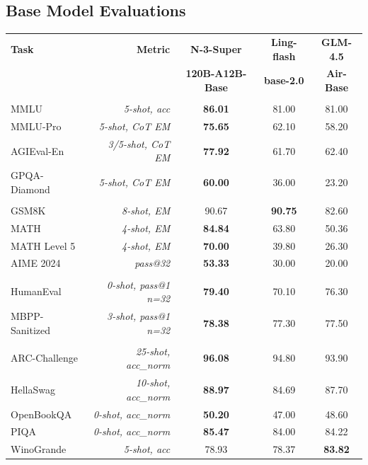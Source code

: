 \subsection{Base Model Evaluations}
\label{subsec:base_model_evals}

\begin{table}[h!]
\centering
\small
\setlength{\tabcolsep}{7pt}
\renewcommand{\arraystretch}{1.3}

\begin{tabular}{lr|ccc}
\toprule
\textbf{Task} & \textbf{Metric} &
\multicolumn{1}{c}{\textbf{N-3-Super}} &
\multicolumn{1}{c}{\textbf{Ling-flash}} &
\multicolumn{1}{c}{\textbf{GLM-4.5}} \\
& &
\multicolumn{1}{c}{\textbf{120B-A12B-Base}} &
\multicolumn{1}{c}{\textbf{base-2.0}} &
\multicolumn{1}{c}{\textbf{Air-Base}} \\
\midrule

\rowcolor{black!5}
\multicolumn{5}{l}{\textbf{General Knowledge}} \\
MMLU & \textit{5-shot, acc} & \textbf{86.01} & 81.00 & 81.00 \\
MMLU-Pro & \textit{5-shot, CoT EM} & \textbf{75.65} & 62.10 & 58.20 \\
AGIEval-En & \textit{3/5-shot, CoT EM} & \textbf{77.92} & 61.70 & 62.40 \\
GPQA-Diamond & \textit{5-shot, CoT EM} & \textbf{60.00} & 36.00 & 23.20 \\
\midrule

\rowcolor{black!5}
\multicolumn{5}{l}{\textbf{MATH}} \\
GSM8K & \textit{8-shot, EM} & 90.67 & \textbf{90.75} & 82.60 \\
MATH & \textit{4-shot, EM} & \textbf{84.84} & 63.80 & 50.36 \\
MATH Level 5 & \textit{4-shot, EM} & \textbf{70.00} & 39.80 & 26.30 \\
AIME 2024 & \textit{pass@32} & \textbf{53.33} & 30.00 & 20.00 \\
\midrule

\rowcolor{black!5}
\multicolumn{5}{l}{\textbf{Code}} \\
HumanEval & \textit{0-shot, pass@1 n=32} & \textbf{79.40} & 70.10 & 76.30 \\
MBPP-Sanitized & \textit{3-shot, pass@1 n=32} & \textbf{78.38} & 77.30 & 77.50 \\
\midrule

\rowcolor{black!5}
\multicolumn{5}{l}{\textbf{Commonsense Understanding}} \\
ARC-Challenge & \textit{25-shot, acc\_norm} & \textbf{96.08} & 94.80 & 93.90 \\
HellaSwag & \textit{10-shot, acc\_norm} & \textbf{88.97} & 84.69 & 87.70 \\
OpenBookQA & \textit{0-shot, acc\_norm} & \textbf{50.20} & 47.00 & 48.60 \\
PIQA & \textit{0-shot, acc\_norm} & \textbf{85.47} & 84.00 & 84.22 \\
WinoGrande & \textit{5-shot, acc} & 78.93 & 78.37 & \textbf{83.82} \\
\midrule


\end{tabular}
\end{table}
